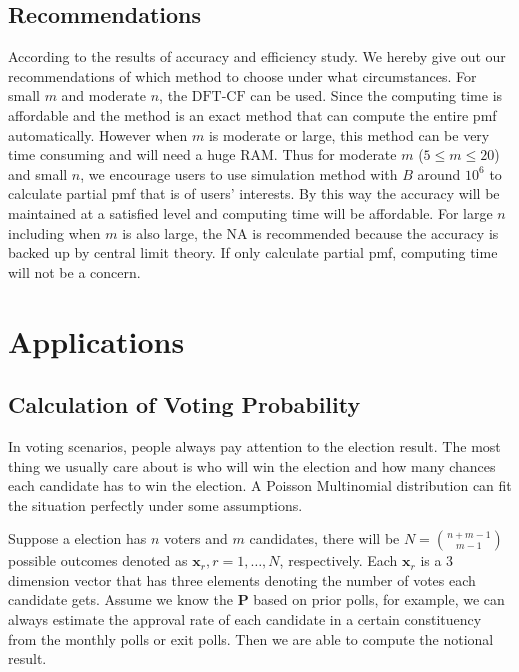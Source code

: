 \documentclass[12pt]{article}
\newcommand{\Pmat}{\mathbf{P}}
\newcommand{\xvec}{\boldsymbol{x}}
\newcommand{\NA}{{\textrm{NA}}}
\newcommand{\dft}{{\textrm{DFT-CF}}}
\begin{document}
\subsection{Recommendations}
According to the results of accuracy and efficiency study. We hereby give out our recommendations of which method to choose under what circumstances. For small $m$ and moderate $n$, the $\dft$ can be used. Since the computing time is affordable and the method is an exact method that can compute the entire pmf automatically. However when $m$ is moderate or large, this method can be very time consuming and will need a huge RAM. Thus for moderate $m$ ($5 \leq m \leq 20$) and small $n$, we encourage users to use simulation method with $B$ around $10^6$ to calculate partial pmf that is of users' interests. By this way the accuracy will be maintained at a satisfied level and computing time will be affordable. For large $n$ including when $m$ is also large, the $\NA$ is recommended because the accuracy is backed up by central limit theory. If only calculate partial pmf, computing time will not be a concern.

\section{Applications}
\subsection{Calculation of Voting Probability}
In voting scenarios, people always pay attention to the election result. The most thing we usually care about is who will win the election and how many chances each candidate has to win the election. A Poisson Multinomial distribution can fit the situation perfectly under some assumptions.

Suppose a election has $n$ voters and $m$ candidates, there will be $N = \binom{n+m-1}{m-1}$ possible outcomes denoted as $\xvec_r, r = 1, \dots, N$, respectively. Each $\xvec_r$ is a 3 dimension vector that has three elements denoting the number of votes each candidate gets. Assume we know the $\Pmat$ based on prior polls, for example, we can always estimate the approval rate of each candidate in a certain constituency from the monthly polls or exit polls. Then we are able to compute the notional result.
\end{document}
